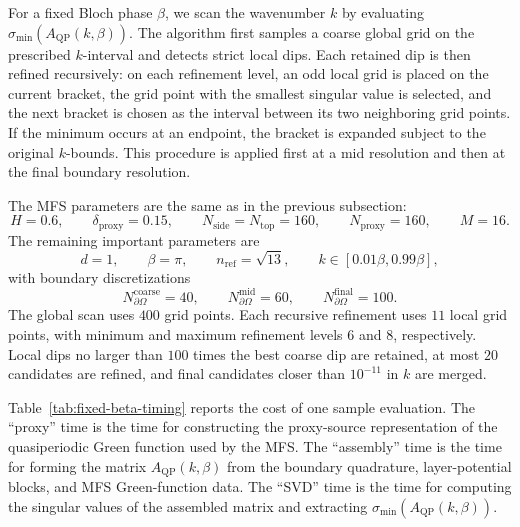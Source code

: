 \documentclass[11pt,fleqn]{article}
\newcommand{\Aqp}{A_{\mathrm{QP}}}
\theoremstyle{definition}
\theoremstyle{remark}
\begin{document}
For a fixed Bloch phase \(\beta\), we scan the wavenumber \(k\) by evaluating
\(\sigma_{\min}(\Aqp(k,\beta))\). The algorithm first samples a coarse global
grid on the prescribed \(k\)-interval and detects strict local dips. Each
retained dip is then refined recursively: on each refinement level, an odd
local grid is placed on the current bracket, the grid point with the smallest
singular value is selected, and the next bracket is chosen as the interval
between its two neighboring grid points. If the minimum occurs at an endpoint,
the bracket is expanded subject to the original \(k\)-bounds. This procedure is
applied first at a mid resolution and then at the final boundary resolution.

The MFS parameters are the same as in the previous subsection:
\[
  H=0.6,\qquad \delta_{\mathrm{proxy}}=0.15,\qquad
  N_{\mathrm{side}}=N_{\mathrm{top}}=160,\qquad
  N_{\mathrm{proxy}}=160,\qquad M=16 .
\]
The remaining important parameters are
\[
  d=1,\qquad \beta=\pi,\qquad n_{\mathrm{ref}}=\sqrt{13},\qquad
  k\in[0.01\beta,0.99\beta],
\]
with boundary discretizations
\[
  N_{\partial\Omega}^{\mathrm{coarse}}=40,\qquad
  N_{\partial\Omega}^{\mathrm{mid}}=60,\qquad
  N_{\partial\Omega}^{\mathrm{final}}=100.
\]
The global scan uses \(400\) grid points. Each recursive refinement uses
\(11\) local grid points, with minimum and maximum refinement levels \(6\) and
\(8\), respectively. Local dips no larger than \(100\) times the best coarse
dip are retained, at most \(20\) candidates are refined, and final candidates
closer than \(10^{-11}\) in \(k\) are merged.

Table~\ref{tab:fixed-beta-timing} reports the cost of one sample evaluation.
The ``proxy'' time is the time for constructing the proxy-source
representation of the quasiperiodic Green function used by the MFS. The
``assembly'' time is the time for forming the matrix \(\Aqp(k,\beta)\) from the
boundary quadrature, layer-potential blocks, and MFS Green-function data. The
``SVD'' time is the time for computing the singular values of the assembled
matrix and extracting \(\sigma_{\min}(\Aqp(k,\beta))\).
\end{document}
